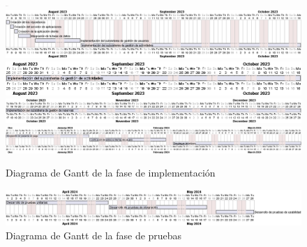 \begin{figure}[H]
	\includegraphics[width=0.01\textwidth]{4-PlanificacionYGestionDelTFG/PlanificacionFinal/gantt/gant-implementacion1.png}
	\vspace{0.4cm}
	\includegraphics[width=1\textwidth]{4-PlanificacionYGestionDelTFG/PlanificacionFinal/gantt/gant-implementacion1.png}
	\vspace{0.4cm}
	\includegraphics[width=1\textwidth]{4-PlanificacionYGestionDelTFG/PlanificacionFinal/gantt/gant-implementacion2.png}
	\vspace{0.4cm}
	\includegraphics[width=1\textwidth]{4-PlanificacionYGestionDelTFG/PlanificacionFinal/gantt/gant-implementacion3.png}
	\vspace{0.4cm}
	\includegraphics[width=1\textwidth]{4-PlanificacionYGestionDelTFG/PlanificacionFinal/gantt/gant-implementacion4.png}
	\caption{Diagrama de Gantt de la fase de implementación}
\end{figure}

\begin{figure}[H]
	\includegraphics[width=1\textwidth]{4-PlanificacionYGestionDelTFG/PlanificacionFinal/gantt/gant-pruebas.png}
	\caption{Diagrama de Gantt de la fase de pruebas}
\end{figure}

